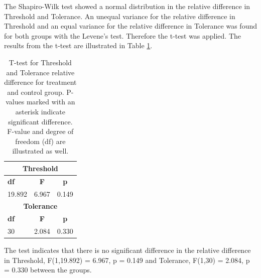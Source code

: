 The Shapiro-Wilk test showed a normal distribution in the relative difference in Threshold and Tolerance. An unequal variance for the relative difference in Threshold and an equal variance for the relative difference in Tolerance was found for both groups with the Levene's test. Therefore the t-test was applied. The results from the t-test are illustrated in Table \ref{table:TTEST}. 

\begin{table}[ht]
\caption{T-test for Threshold and Tolerance relative difference for treatment and control group. P-values marked with an asterisk indicate significant difference. F-value and degree of
freedom (df) are illustrated as well.}
\centering
\begin{tabular}{l c c} 
\toprule
\multicolumn{3}{c}{\textbf{Threshold}} \\
\midrule  
\textbf{df} & \textbf{F} & \textbf{p} \\ [0.5ex] %
19.892 & 6.967 & 0.149    \\
\toprule
\multicolumn{3}{c}{\textbf{Tolerance}} \\
\midrule 
\textbf{df} & \textbf{F} & \textbf{p} \\ [0.5ex] %
30 & 2.084 & 0.330 \\
\hline
\end{tabular}
\label{table:TTEST}
\end{table}

The test indicates that there is no significant difference in the relative difference in Threshold, F(1,19.892) = 6.967, p = 0.149 and Tolerance, F(1,30) = 2.084, p = 0.330 between the groups.
